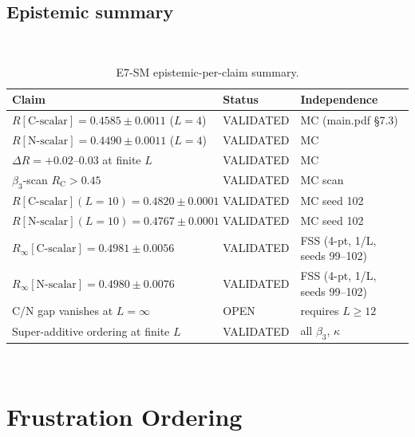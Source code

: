 \documentclass[12pt,a4paper]{article}
\theoremstyle{plain}
\theoremstyle{definition}
\theoremstyle{remark}
\newcommand{\RinfCscalar}{0.4981 \pm 0.0056}      %
\newcommand{\RinfNscalar}{0.4980 \pm 0.0076}      %
\begin{document}
\subsection{Epistemic summary}

\begin{table}[htbp]
\caption{E7-SM epistemic-per-claim summary.}
\label{tab:SM-epistemic}
\
\begin{tabular}{p{5.5cm}ll}
\toprule
Claim & Status & Independence \\
\midrule
$R[\text{C-scalar}]=0.4585\pm0.0011$ ($L=4$) & VALIDATED & MC (main.pdf \S7.3) \\
$R[\text{N-scalar}]=0.4490\pm0.0011$ ($L=4$) & VALIDATED & MC \\
$\Delta R=+0.02$--$0.03$ at finite $L$ & VALIDATED & MC \\
$\beta_3$-scan $R_{\text{C}}>0.45$ & VALIDATED & MC scan \\
$R[\text{C-scalar}](L{=}10)=0.4820\pm0.0001$ & VALIDATED & MC seed 102 \\
$R[\text{N-scalar}](L{=}10)=0.4767\pm0.0001$ & VALIDATED & MC seed 102 \\
$R_\infty[\text{C-scalar}]=\RinfCscalar$ & VALIDATED & FSS (4-pt, 1/L, seeds 99--102) \\
$R_\infty[\text{N-scalar}]=\RinfNscalar$ & VALIDATED & FSS (4-pt, 1/L, seeds 99--102) \\
C/N gap vanishes at $L=\infty$ & OPEN & requires $L\geq 12$ \\
Super-additive ordering at finite $L$ & VALIDATED & all $\beta_3$, $\kappa$ \\
\bottomrule
\end{tabular}
\
\end{table}


\section{Frustration Ordering}
\label{sec:ordering}
\end{document}
